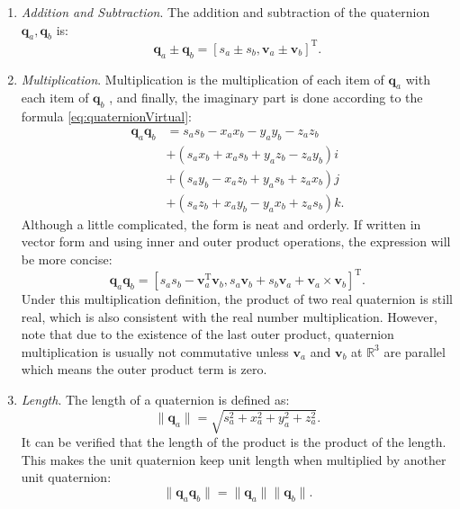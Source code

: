 \begin{enumerate}
    \item { \emph {Addition and Subtraction}.} The addition and subtraction of the quaternion $ \mathbf {q}_a, \mathbf {q}_b $ is:
    \begin{equation} 	
    \mathbf{q}_a \pm \mathbf{q}_b = \left[ s_a \pm s_b, \mathbf{v}_a \pm \mathbf{v}_b \right]^\mathrm{T}.
    \end{equation}
    \item { \emph {Multiplication}}. Multiplication is the multiplication of each item of $ \mathbf {q}_a $ with each item of $ \mathbf {q}_b $ , and finally, the imaginary part is done according to the formula \eqref {eq:quaternionVirtual}:
    \begin{equation}
    \begin{aligned}
    \mathbf{q}_a \mathbf{q}_b &= {s_a}{s_b} - {x_a}{x_b} - {y_a}{y_b} - {z_a}{z_b}\\
    &+ \left( {{s_a}{x_b} + {x_a}{s_b} + {y_a}{z_b} - {z_a}{y_b}} \right)i\\
    &+ \left( {{s_a}{y_b} - {x_a}{z_b} + {y_a}{s_b} + {z_a}{x_b}} \right)j\\
    &+ \left( {{s_a}{z_b} + {x_a}{y_b} - {y_a}{x_b} + {z_a}{s_b}} \right)k.
    \end{aligned}
    \end{equation}
    Although a little complicated, the form is neat and orderly. If written in vector form and using inner and outer product operations, the expression will be more concise:
    \begin{equation}
    \mathbf{q}_a \mathbf{q}_b = \left[ s_a s_b - \mathbf{v}_a^\mathrm{T} \mathbf{v}_b, s_a\mathbf{v}_b + s_b\mathbf{v}_a + \mathbf{v}_a \times \mathbf{v}_b \right]^\mathrm{T}.
    \end{equation}
    Under this multiplication definition, the product of two real quaternion is still real, which is also consistent with the real number multiplication. However, note that due to the existence of the last outer product, quaternion multiplication is usually not commutative unless $ \mathbf {v}_a $ and $ \mathbf {v}_b $ at $ \mathbb {R}^ 3 $ are parallel which means the outer product term is zero.
    
    \item { \emph {Length}. } The length of a quaternion is defined as:
    \begin{equation}
    \| \mathbf{q}_a \| = \sqrt{ s_a^2 + x_a^2 + y_a^2 + z_a^2 }.
    \end{equation}
    It can be verified that the length of the product is the product of the length. This makes the unit quaternion keep unit length when multiplied by another unit quaternion:
    \begin{equation}
    \| \mathbf{q}_a \mathbf{q}_b \| = \|\mathbf{q}_a \| \| \mathbf{q}_b \|.
    \end{equation}
    

\end{enumerate}
